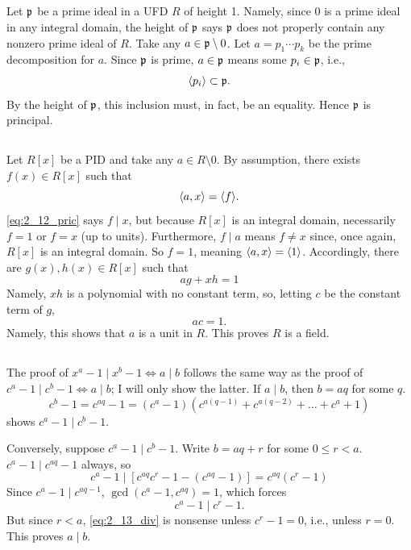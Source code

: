 \documentclass[12pt]{article}
\begin{document}
\setcounter{subsection}{8} 
\subsection{}
Let $\mathfrak{p}$ be a prime ideal in a UFD $R$ of height 1. 
Namely, since 0 is a prime ideal in any integral domain, the height of $\mathfrak{p}$ says $\mathfrak{p}$ does not properly contain any nonzero prime ideal of $R$. 
Take any $a \in \mathfrak{p} \setminus 0$. 
Let $a = p_1\cdots p_k$ be the prime decomposition for $a$. 
Since $\mathfrak{p}$ is prime, $a \in \mathfrak{p}$ means some $p_i \in \mathfrak{p}$, i.e., 
$$\langle p_i\rangle \subset \mathfrak{p}.$$
By the height of $\mathfrak{p}$, this inclusion must, in fact, be an equality. 
Hence $\mathfrak{p}$ is principal.

\setcounter{subsection}{11} 
\subsection{} 
Let $R[x]$ be a PID and take any $a \in R \setminus 0$. 
By assumption, there exists $f(x) \in R[x]$ such that 
\begin{equation} \label{eq:2_12_pric}
  \langle a, x\rangle = \langle f\rangle.
\end{equation}
\eqref{eq:2_12_pric} says $f \mid x$, but because $R[x]$ is an integral domain, necessarily $f = 1$ or $f = x$ (up to units). 
Furthermore, $f \mid a$ means $f \neq x$ since, once again, $R[x]$ is an integral domain. 
So $f = 1$, meaning $\langle a, x\rangle = \langle1\rangle$. 
Accordingly, there are $g(x), h(x) \in R[x]$ such that 
$$ag + xh = 1$$
Namely, $xh$ is a polynomial with no constant term, so, letting $c$ be the constant term of $g$, 
$$ac = 1.$$
Namely, this shows that $a$ is a unit in $R$. 
This proves $R$ is a field. 

\subsection{} 
The proof of $x^a - 1\mid x^b - 1 \iff a \mid b$ follows the same way as the proof of $c^a - 1 \mid c^b - 1 \iff a \mid b$; 
I will only show the latter. 
If $a \mid b$, then $b = aq$ for some $q$. 
$$c^{b} - 1 = c^{aq} - 1 = (c^a - 1)(c^{a(q - 1)} + c^{a(q - 2)} + \ldots + c^a + 1)$$
shows $c^a - 1 \mid c^b - 1$. 

Conversely, suppose $c^a - 1 \mid c^b - 1$. 
Write $b = aq + r$ for some $0 \leq r < a$. 
$c^a - 1 \mid c^{aq} - 1$ always, so 
$$c^a - 1 \mid [c^{aq}c^r - 1 - (c^{aq} - 1)] = c^{aq}(c^r - 1)$$
Since $c^a - 1 \mid c^{aq - 1}$, $\gcd(c^a - 1, c^{aq}) = 1$, which forces 
\begin{equation} \label{eq:2_13_div}
  c^a - 1 \mid c^r - 1. 
\end{equation}
But since $r < a$, \eqref{eq:2_13_div} is nonsense unless $c^r - 1 = 0$, i.e., unless $r = 0$. 
This proves $a \mid b$. 
\end{document}
